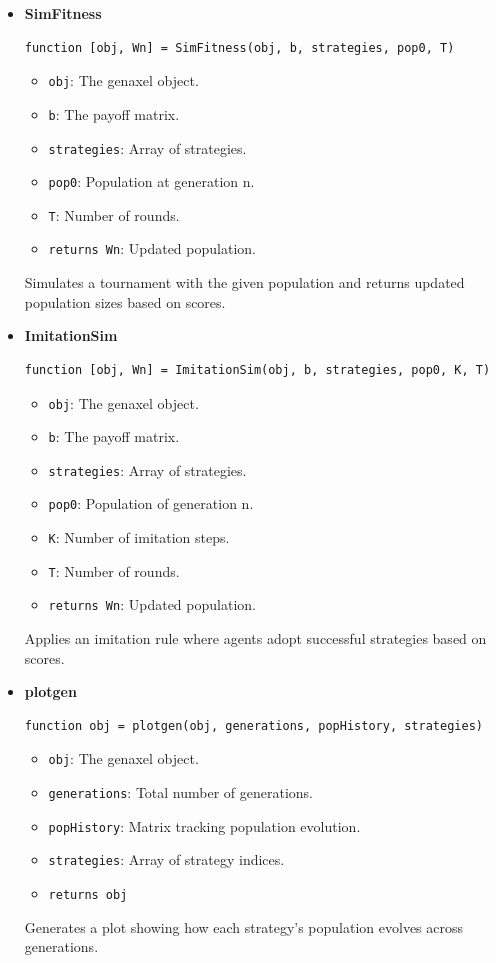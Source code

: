 \documentclass[12pt]{report}
\begin{document}
\begin{itemize}
  \item \textbf{SimFitness}
  \begin{verbatim}
function [obj, Wn] = SimFitness(obj, b, strategies, pop0, T)
  \end{verbatim}
  \begin{itemize}
    \item \texttt{obj}: The genaxel object.
    \item \texttt{b}: The payoff matrix.
    \item \texttt{strategies}: Array of strategies.
    \item \texttt{pop0}: Population at generation n.
    \item \texttt{T}: Number of rounds.
    \item \texttt{returns Wn}: Updated population.
  \end{itemize}
  Simulates a tournament with the given population and returns updated population sizes based on scores.

  \item \textbf{ImitationSim}
  \begin{verbatim}
function [obj, Wn] = ImitationSim(obj, b, strategies, pop0, K, T)
  \end{verbatim}
  \begin{itemize}
    \item \texttt{obj}: The genaxel object.
    \item \texttt{b}: The payoff matrix.
    \item \texttt{strategies}: Array of strategies.
    \item \texttt{pop0}: Population of generation n.
    \item \texttt{K}: Number of imitation steps.
    \item \texttt{T}: Number of rounds.
    \item \texttt{returns Wn}: Updated population.
  \end{itemize}
  Applies an imitation rule where agents adopt successful strategies based on scores.

  \item \textbf{plotgen}
  \begin{verbatim}
function obj = plotgen(obj, generations, popHistory, strategies)
  \end{verbatim}
  \begin{itemize}
    \item \texttt{obj}: The genaxel object.
    \item \texttt{generations}: Total number of generations.
    \item \texttt{popHistory}: Matrix tracking population evolution.
    \item \texttt{strategies}: Array of strategy indices.
    \item \texttt{returns obj}
  \end{itemize}
  Generates a plot showing how each strategy's population evolves across generations.

\end{itemize}
\newpage
\end{document}
